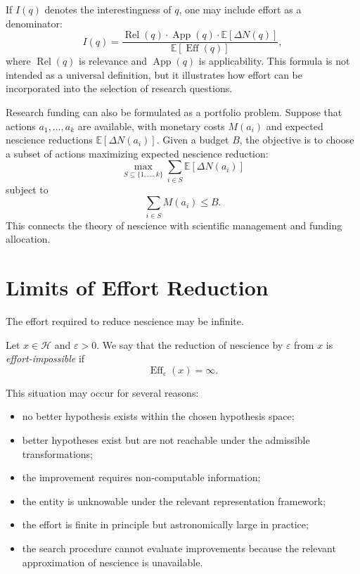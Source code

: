 If \(I(q)\) denotes the interestingness of \(q\), one may include effort as a denominator:
\[
I(q)=
\frac{
\operatorname{Rel}(q)\cdot \operatorname{App}(q)\cdot \mathbb{E}[\Delta N(q)]
}{
\mathbb{E}[\operatorname{Eff}(q)]
},
\]
where \(\operatorname{Rel}(q)\) is relevance and \(\operatorname{App}(q)\) is applicability. This formula is not intended as a universal definition, but it illustrates how effort can be incorporated into the selection of research questions.

Research funding can also be formulated as a portfolio problem. Suppose that actions \(a_1,\ldots,a_k\) are available, with monetary costs \(M(a_i)\) and expected nescience reductions \(\mathbb{E}[\Delta N(a_i)]\). Given a budget \(B\), the objective is to choose a subset of actions maximizing expected nescience reduction:
\[
\max_{S\subseteq\{1,\ldots,k\}}
\sum_{i\in S}\mathbb{E}[\Delta N(a_i)]
\]
subject to
\[
\sum_{i\in S}M(a_i)\leq B.
\]
This connects the theory of nescience with scientific management and funding allocation.

\section{Limits of Effort Reduction}
\label{sec:limits_effort_reduction}

The effort required to reduce nescience may be infinite.

\begin{definition}
Let \(x\in\mathcal{H}\) and \(\varepsilon>0\). We say that the reduction of nescience by \(\varepsilon\) from \(x\) is \emph{effort-impossible} if
\[
\operatorname{Eff}_{\varepsilon}(x)=\infty.
\]
\end{definition}

This situation may occur for several reasons:
\begin{itemize}
    \item no better hypothesis exists within the chosen hypothesis space;
    \item better hypotheses exist but are not reachable under the admissible transformations;
    \item the improvement requires non-computable information;
    \item the entity is unknowable under the relevant representation framework;
    \item the effort is finite in principle but astronomically large in practice;
    \item the search procedure cannot evaluate improvements because the relevant approximation of nescience is unavailable.
\end{itemize}

